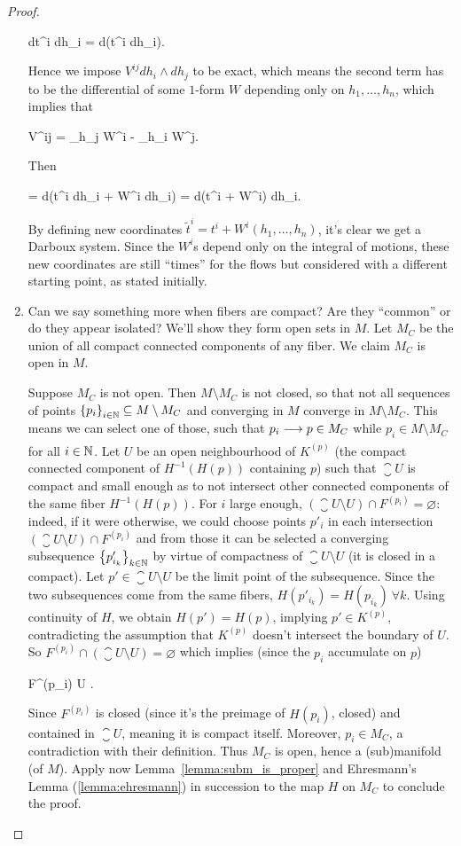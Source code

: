 \documentclass[main.tex]{subfiles}
\begin{document}
\begin{proof}
\begin{enumerate}
\begin{eqalign}
			dt^i \wedge dh_i = d(t^i dh_i).
		\end{eqalign}
		Hence we impose $V^{ij} dh_i \wedge dh_j$ to be exact, which means the second term has to be the differential of some $1$-form $W$ depending only on $h_1, \ldots, h_n$, which implies that
		\begin{eqalign}
			V^{ij} = \partial_{h_j} W^i - \partial_{h_i} W^j.
		\end{eqalign}
		Then
		\begin{eqalign}
			\omega = d(t^i dh_i + W^i dh_i) = d(t^i + W^i) \wedge dh_i.
		\end{eqalign}
		By defining new coordinates $\tilde{t}^i = t^i + W^i(h_1, \ldots, h_n)$, it's clear we get a Darboux system. Since the $W^i$s depend only on the integral of motions, these new coordinates are still ``times'' for the flows but considered with a different starting point, as stated initially.

		\item Can we say something more when fibers are compact? Are they ``common'' or do they appear isolated? We'll show they form open sets in $M$. Let $M_C$ be the union of all compact connected components of any fiber. We claim $M_C$ is open in $M$.

		Suppose $M_C$ is not open. Then $M \setminus M_C$ is not closed, so that not all sequences of points $\left\{p_{i}\right\}_{i \in \mathbb{N}} \subseteq M \setminus M_C$ and converging in $M$ converge in $M \setminus M_C$. This means we can select one of those, such that $p_i \underset{{}}{\longrightarrow} p \in M_C$ while $p_i \in M \setminus M_C$ for all $i \in \mathbb{N}$. Let $U$ be an open neighbourhood of $K^{(p)}$ (the compact connected component of $H^{-1}(H(p))$ containing $p$) such that $\closure U$ is compact and small enough as to not intersect other connected components of the same fiber $H^{-1}(H(p))$. For $i$ large enough, $(\closure U \setminus U) \cap F^{(p_i)} = \varnothing$: indeed, if it were otherwise, we could choose points $p'_i$ in each intersection $(\closure U \setminus U) \cap F^{(p_i)}$ and from those it can be selected a converging subsequence $\left\{p'_{i_{k}}\right\}_{k \in \mathbb{N}}$ by virtue of compactness of $\closure U \setminus U$ (it is closed in a compact). Let $p' \in \closure U \setminus U$ be the limit point of the subsequence. Since the two subsequences come from the same fibers, $H(p'_{i_k}) = H(p_{i_k})\ \forall k$. Using continuity of $H$, we obtain $H(p') = H(p)$, implying $p' \in K^{(p)}$, contradicting the assumption that $K^{(p)}$ doesn't intersect the boundary of $U$. So $F^{(p_i)} \cap (\closure U \setminus U) = \varnothing$ which implies (since the $p_i$ accumulate on $p$)
		\begin{eqalign}
			F^{(p_i)} \subseteq U \quad \forall \text{$i$ large enough}.
		\end{eqalign}
		Since $F^{(p_i)}$ is closed (since it's the preimage of $H(p_i)$, closed) and contained in $\closure U$, meaning it is compact itself. Moreover, $p_i \in M_C$, a contradiction with their definition. Thus $M_C$ is open, hence a (sub)manifold (of $M$). Apply now Lemma~\ref{lemma:subm_is_proper} and Ehresmann's Lemma (\ref{lemma:ehresmann}) in succession to the map $H$ on $M_C$ to conclude the proof.


\end{enumerate}
\end{proof}
\end{document}
